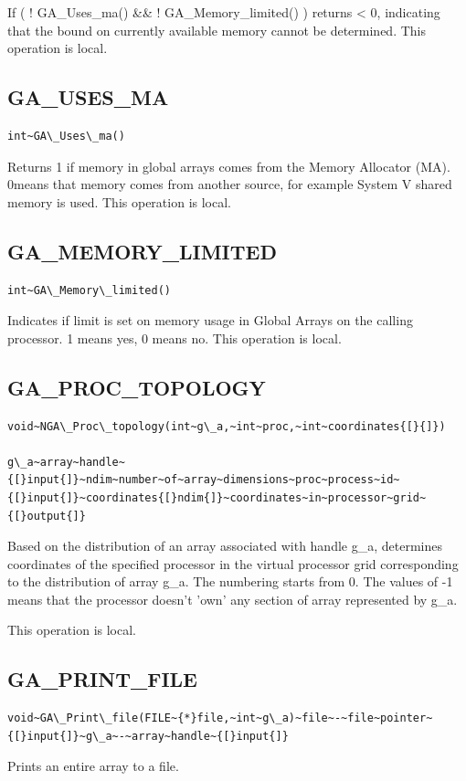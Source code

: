 If ( ! GA\_Uses\_ma() \&\& ! GA\_Memory\_limited() ) returns < 0,
indicating that the bound on currently available memory cannot be
determined. This operation is local. 


\subsection*{\label{sub:GA_USES_MA}GA\_USES\_MA}
\begin{verbatim}
int~GA\_Uses\_ma()
\end{verbatim}
Returns \textquotedbl{}1\textquotedbl{} if memory in global arrays
comes from the Memory Allocator (MA). \textquotedbl{}0\textquotedbl{}means
that memory comes from another source, for example System V shared
memory is used. This operation is local. 


\subsection*{\label{sub:GA_MEMORY_LIMITED}GA\_MEMORY\_LIMITED}
\begin{verbatim}
int~GA\_Memory\_limited()
\end{verbatim}
Indicates if limit is set on memory usage in Global Arrays on the
calling processor. \textquotedbl{}1\textquotedbl{} means \textquotedbl{}yes\textquotedbl{},
\textquotedbl{}0\textquotedbl{} means \textquotedbl{}no\textquotedbl{}.
This operation is local. 


\subsection*{\label{sub:GA_PROC_TOPOLOGY}GA\_PROC\_TOPOLOGY}
\begin{verbatim}
void~NGA\_Proc\_topology(int~g\_a,~int~proc,~int~coordinates{[}{]})

g\_a~array~handle~{[}input{]}~ndim~number~of~array~dimensions~proc~process~id~{[}input{]}~coordinates{[}ndim{]}~coordinates~in~processor~grid~{[}output{]}
\end{verbatim}
Based on the distribution of an array associated with handle g\_a,
determines coordinates of the specified processor in the virtual processor
grid corresponding to the distribution of array g\_a. The numbering
starts from 0. The values of -1 means that the processor doesn't 'own'
any section of array represented by g\_a.

This operation is local. 


\subsection*{\label{sub:GA_PRINT_FILE}GA\_PRINT\_FILE}
\begin{verbatim}
void~GA\_Print\_file(FILE~{*}file,~int~g\_a)~file~-~file~pointer~{[}input{]}~g\_a~-~array~handle~{[}input{]}
\end{verbatim}
Prints an entire array to a file.

